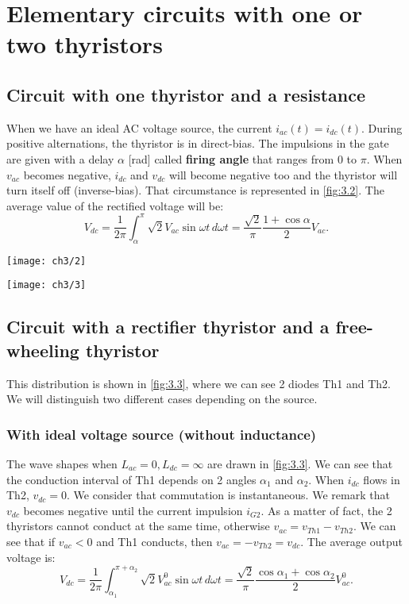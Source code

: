	\section{Elementary circuits with one or two thyristors}
		\subsection{Circuit with one thyristor and a resistance}
		    When we have an ideal AC voltage source, the current $i_{ac}(t) = i_{dc}(t)$. During positive alternations, the thyristor is in direct-bias. The impulsions in the gate are given with a delay $\alpha$ [rad] called \textbf{firing angle} that ranges from 0 to $\pi$. When $v_{ac}$ becomes negative, $i_{dc}$ and $v_{dc}$ will become negative too and the thyristor will turn itself off (inverse-bias). That circumstance is represented in \autoref{fig:3.2}. The average value of the rectified voltage will be:
			\begin{equation}
				V_{dc} = \frac{1}{2\pi}\int _\alpha ^\pi \sqrt{2} V_{ac} \sin \omega t \, d\omega t = \frac{\sqrt{2}}{\pi} \frac{1+\cos \alpha}{2} V_{ac}.
			\end{equation}
			
			\begin{minipage}{0.49\textwidth}
				\texttt{[image: ch3/2]}
				\label{fig:3.2}
			\end{minipage}
			\begin{minipage}{0.49\textwidth}
				\texttt{[image: ch3/3]}
				\label{fig:3.3}
			\end{minipage}
			
		\subsection{Circuit with a rectifier thyristor and a free-wheeling thyristor}
		This distribution is shown in \autoref{fig:3.3}, where we can see 2 diodes Th1 and Th2. We will distinguish two different cases depending on the source.  
			
			\subsubsection{With ideal voltage source (without inductance)}
				The wave shapes when $L_{ac} = 0, L_{dc} = \infty$ are drawn in \autoref{fig:3.3}. We can see that the conduction interval of Th1 depends on 2 angles $\alpha _1$ and $\alpha _2$. When $i_{dc}$ flows in Th2, $v_{dc} = 0$. We consider that commutation is instantaneous. We remark that $v_{dc}$ becomes negative until the current impulsion $i_{G2}$. As a matter of fact, the 2 thyristors cannot conduct at the same time, otherwise $v_{ac} = v_{Th1} - v_{Th2}$. We can see that if $v_{ac} < 0$ and Th1 conducts, then $v_{ac} = -v_{Th2} = v_{dc}$. The average output voltage is: 
				\begin{equation}
					V_{dc} = \frac{1}{2\pi} \int _{\alpha _1} ^{\pi + \alpha _2} \sqrt{2} V_{ac}^0\sin \omega t \, d\omega t = \frac{\sqrt{2}}{\pi} \frac{\cos \alpha _1 + \cos \alpha _2}{2} V_{ac}^0.
 				\end{equation}
		

